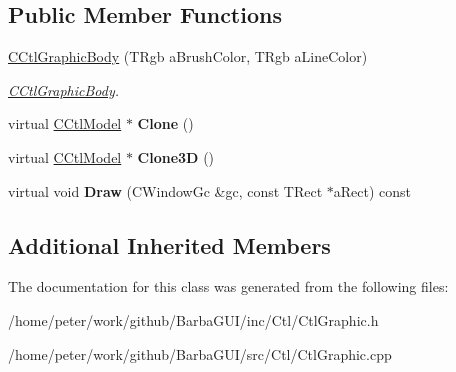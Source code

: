 \subsection*{Public Member Functions}
\begin{DoxyCompactItemize}
\item 
\mbox{\label{classCCtlGraphicBody_ab72452232681db8b83338e494c514e52}} 
\hyperlink{classCCtlGraphicBody_ab72452232681db8b83338e494c514e52}{C\+Ctl\+Graphic\+Body} (T\+Rgb a\+Brush\+Color, T\+Rgb a\+Line\+Color)
\begin{DoxyCompactList}\small\item\em \hyperlink{classCCtlGraphicBody}{C\+Ctl\+Graphic\+Body}. \end{DoxyCompactList}\item 
\mbox{\label{classCCtlGraphicBody_aa9941adefbe2d6b52e3ea908fb900571}} 
virtual \hyperlink{classCCtlModel}{C\+Ctl\+Model} $\ast$ {\bfseries Clone} ()
\item 
\mbox{\label{classCCtlGraphicBody_a8a9f6c7dc81473e81efb462aae43c3fc}} 
virtual \hyperlink{classCCtlModel}{C\+Ctl\+Model} $\ast$ {\bfseries Clone3D} ()
\item 
\mbox{\label{classCCtlGraphicBody_a54172fb69837af17afcf09fa0ca050c9}} 
virtual void {\bfseries Draw} (C\+Window\+Gc \&gc, const T\+Rect $\ast$a\+Rect) const
\end{DoxyCompactItemize}
\subsection*{Additional Inherited Members}


The documentation for this class was generated from the following files\+:\begin{DoxyCompactItemize}
\item 
/home/peter/work/github/\+Barba\+G\+U\+I/inc/\+Ctl/Ctl\+Graphic.\+h\item 
/home/peter/work/github/\+Barba\+G\+U\+I/src/\+Ctl/Ctl\+Graphic.\+cpp\end{DoxyCompactItemize}
